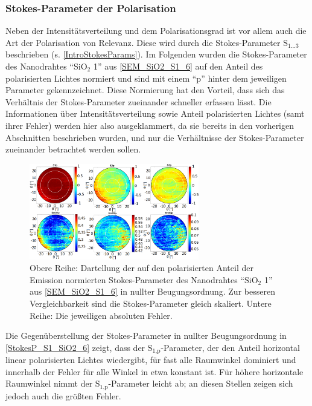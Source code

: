 \subsubsection{Stokes-Parameter der Polarisation}
Neben der Intensitätsverteilung und dem Polarisationsgrad ist vor allem auch die Art der Polarisation von Relevanz. Diese wird durch die Stokes-Parameter $\text{S}_{\text{1} \ldots \text{3}}$ beschrieben (s. \autoref{IntroStokesParams}). Im Folgenden wurden die Stokes-Parameter des Nanodrahtes ``SiO$_\text{2}$ 1'' aus \autoref{SEM_SiO2_S1_6} auf den Anteil des polarisierten Lichtes normiert und sind mit einem ``p'' hinter dem jeweiligen Parameter gekennzeichnet. Diese Normierung hat den Vorteil, dass sich das Verhältnis der Stokes-Parameter zueinander schneller erfassen lässt. Die Informationen über Intensitätsverteilung sowie Anteil polarisierten Lichtes (samt ihrer Fehler) werden hier also ausgeklammert, da sie bereits in den vorherigen Abschnitten beschrieben wurden, und nur die Verhältnisse der Stokes-Parameter zueinander betrachtet werden sollen.\begin{figure}[b]
\centering
\includegraphics[width=0.66\textwidth]{Bilder/SiO2/StokesP_S1_Si02_6}
\caption{Obere Reihe: Dartellung der auf den polarisierten Anteil der Emission normierten Stokes-Parameter des Nanodrahtes ``SiO$_\text{2}$ 1'' aus \autoref{SEM_SiO2_S1_6} in nullter Beugungsordnung. Zur besseren Vergleichbarkeit sind die Stokes-Parameter gleich skaliert. Untere Reihe: Die jeweiligen absoluten Fehler.}
\label{StokesP_S1_SiO2_6}
\end{figure}Die Gegenüberstellung der Stokes-Parameter in nullter Beugungsordnung in \autoref{StokesP_S1_SiO2_6} zeigt, dass der $\text{S}_\text{1,p}$-Parameter, der den Anteil horizontal linear polarisierten Lichtes wiedergibt, für fast alle Raumwinkel dominiert und innerhalb der Fehler für alle Winkel in etwa konstant ist. Für höhere horizontale Raumwinkel nimmt der $\text{S}_\text{1,p}$-Parameter leicht ab; an diesen Stellen zeigen sich jedoch auch die größten Fehler.\\
